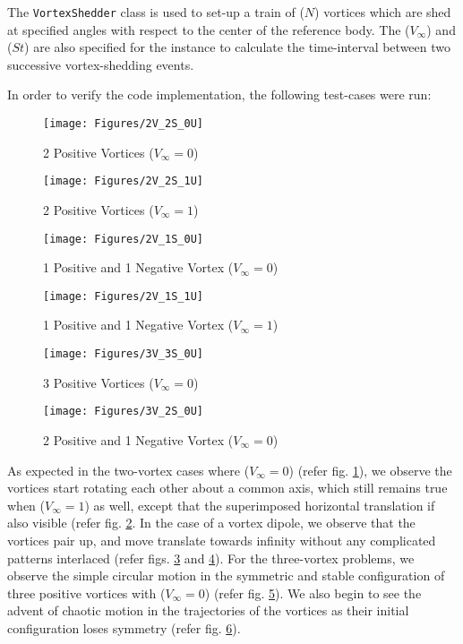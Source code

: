 The \texttt{VortexShedder} class is used to set-up a train of ($N$) vortices which are shed at specified angles with respect to the center of the reference body. The ($V_{\infty}$) and ($St$) are also specified for the instance to calculate the time-interval between two successive vortex-shedding events.

In order to verify the code implementation, the following test-cases were run:
\begin{figure}[H]
	\centering
	\texttt{[image: Figures/2V\_2S\_0U]}
	\caption{2 Positive Vortices ($V_{\infty} = 0$)}
	\label{fig:2V_2S_0U}
\end{figure}
\begin{figure}[H]
	\centering
	\texttt{[image: Figures/2V\_2S\_1U]}
	\caption{2 Positive Vortices ($V_{\infty} = 1$)}
	\label{fig:2V_2S_1U}
\end{figure}
\begin{figure}[H]
	\centering
	\texttt{[image: Figures/2V\_1S\_0U]}
	\caption{1 Positive and 1 Negative Vortex ($V_{\infty} = 0$)}
	\label{fig:2V_1S_0U}
\end{figure}
\begin{figure}[H]
	\centering
	\texttt{[image: Figures/2V\_1S\_1U]}
	\caption{1 Positive and 1 Negative Vortex ($V_{\infty} = 1$)}
	\label{fig:2V_1S_1U}
\end{figure}
\begin{figure}[H]
	\centering
	\texttt{[image: Figures/3V\_3S\_0U]}
	\caption{3 Positive Vortices ($V_{\infty} = 0$)}
	\label{fig:3V_3S_0U}
\end{figure}
\begin{figure}[H]
	\centering
	\texttt{[image: Figures/3V\_2S\_0U]}
	\caption{2 Positive and 1 Negative Vortex ($V_{\infty} = 0$)}
	\label{fig:3V_2S_0U}
\end{figure}
As expected in the two-vortex cases where ($V_{\infty} = 0$) (refer fig. \ref{fig:2V_2S_0U}), we observe the vortices start rotating each other about a common axis, which still remains true when ($V_{\infty} = 1$) as well, except that the superimposed horizontal translation if also visible (refer fig. \ref{fig:2V_2S_1U}.
In the case of a vortex dipole, we observe that the vortices pair up, and move translate towards infinity without any complicated patterns interlaced (refer figs. \ref{fig:2V_1S_0U} and \ref{fig:2V_1S_1U}).
For the three-vortex problems, we observe the simple circular motion in the symmetric and stable configuration of three positive vortices with ($V_{\infty} = 0$) (refer fig. \ref{fig:3V_3S_0U}). We also begin to see the advent of chaotic motion in the trajectories of the vortices as their initial configuration loses symmetry (refer fig. \ref{fig:3V_2S_0U}).
